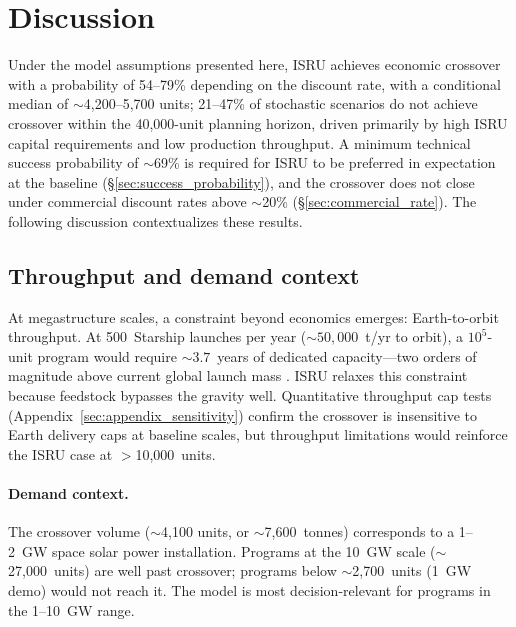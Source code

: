 \documentclass[preprint,12pt]{elsarticle}
\begin{document}
\section{Discussion}
\label{sec:discussion}

Under the model assumptions presented here, ISRU achieves economic crossover with a probability of 54--79\% depending on the discount rate, with a conditional median of $\sim$4{,}200--5{,}700 units; 21--47\% of stochastic scenarios do not achieve crossover within the 40{,}000-unit planning horizon, driven primarily by high ISRU capital requirements and low production throughput. A minimum technical success probability of $\sim$69\% is required for ISRU to be preferred in expectation at the baseline (\S\ref{sec:success_probability}), and the crossover does not close under commercial discount rates above $\sim$20\% (\S\ref{sec:commercial_rate}). The following discussion contextualizes these results.

\subsection{Throughput and demand context}
\label{sec:throughput}

At megastructure scales, a constraint beyond economics emerges: Earth-to-orbit throughput. At 500~Starship launches per year (${\sim}50{,}000$~t/yr to orbit), a $10^5$-unit program would require ${\sim}3.7$~years of dedicated capacity---two orders of magnitude above current global launch mass \cite{jones2022}. ISRU relaxes this constraint because feedstock bypasses the gravity well. Quantitative throughput cap tests (Appendix~\ref{sec:appendix_sensitivity}) confirm the crossover is insensitive to Earth delivery caps at baseline scales, but throughput limitations would reinforce the ISRU case at $>$10{,}000~units.

\paragraph{Demand context.} The crossover volume ($\sim$4,100 units, or $\sim$7,600~tonnes) corresponds to a 1--2~GW space solar power installation. Programs at the 10~GW scale ($\sim$27,000~units) are well past crossover; programs below $\sim$2,700~units (1~GW demo) would not reach it. The model is most decision-relevant for programs in the 1--10~GW range.
\end{document}
